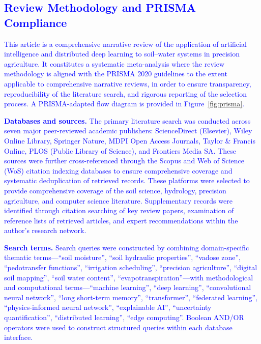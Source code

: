 \documentclass[land,article,submit,pdftex,moreauthors]{Definitions/mdpi}
\numberwithin{equation}{section}
\begin{document}
\subsection{\textcolor{blue}{Review Methodology and PRISMA Compliance}}

\textcolor{blue}{This article is a comprehensive narrative review of the application of artificial intelligence and distributed deep learning to soil--water systems in precision agriculture. It constitutes a systematic meta-analysis where the review methodology is aligned with the PRISMA 2020 guidelines \citep{regulation2016eu} to the extent applicable to comprehensive narrative reviews, in order to ensure transparency, reproducibility of the literature search, and rigorous reporting of the selection process. A PRISMA-adapted flow diagram is provided in Figure~\ref{fig:prisma}.}

\textcolor{blue}{\textbf{Databases and sources.} The primary literature search was conducted across seven major peer-reviewed academic publishers: ScienceDirect (Elsevier), Wiley Online Library, Springer Nature, MDPI Open Access Journals, Taylor \& Francis Online, PLOS (Public Library of Science), and Frontiers Media SA. These sources were further cross-referenced through the Scopus and Web of Science (WoS) citation indexing databases to ensure comprehensive coverage and systematic deduplication of retrieved records. These platforms were selected to provide comprehensive coverage of the soil science, hydrology, precision agriculture, and computer science literature. Supplementary records were identified through citation searching of key review papers, examination of reference lists of retrieved articles, and expert recommendations within the author's research network.}

\textcolor{blue}{\textbf{Search terms.} Search queries were constructed by combining domain-specific thematic terms---``soil moisture'', ``soil hydraulic properties'', ``vadose zone'', ``pedotransfer functions'', ``irrigation scheduling'', ``precision agriculture'', ``digital soil mapping'', ``soil water content'', ``evapotranspiration''---with methodological and computational terms---``machine learning'', ``deep learning'', ``convolutional neural network'', ``long short-term memory'', ``transformer'', ``federated learning'', ``physics-informed neural network'', ``explainable AI'', ``uncertainty quantification'', ``distributed learning'', ``edge computing''. Boolean AND/OR operators were used to construct structured queries within each database interface.}
\end{document}
